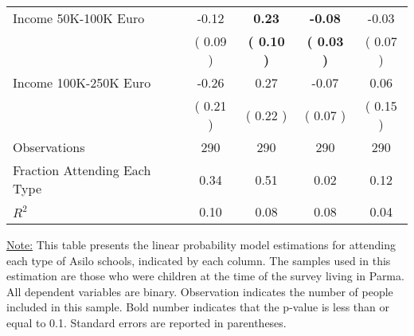 \begin{table}[H]
{\begin{tabular}{lcccc}
\quad Income 50K-100K Euro &     -0.12 & \textbf{     0.23} & \textbf{    -0.08} &     -0.03 \\
\quad  & (     0.09 ) & \textbf{(     0.10 )}  & \textbf{(     0.03 )}  & (     0.07 )  \\
\quad Income 100K-250K Euro &     -0.26 &      0.27 &     -0.07 &      0.06 \\
\quad  & (     0.21 ) & (     0.22 )  & (     0.07 )  & (     0.15 )  \\
\midrule
Observations & 290 & 290 & 290 & 290 \\
Fraction Attending Each Type &      0.34 &      0.51 &      0.02 &      0.12 \\
\midrule
$ R^2$ &      0.10 &      0.08 &      0.08 &      0.04 \\
\bottomrule
\end{tabular}}
\end{table}
\begin{scriptsize}
\noindent\underline{Note:} This table presents the linear probability model estimations for attending each type of Asilo schools, indicated by each column. The samples used in this estimation are those who were children at the time of the survey living in Parma. All dependent variables are binary. Observation indicates the number of people included in this sample. Bold number indicates that the p-value is less than or equal to 0.1. Standard errors are reported in parentheses.
\end{scriptsize}

